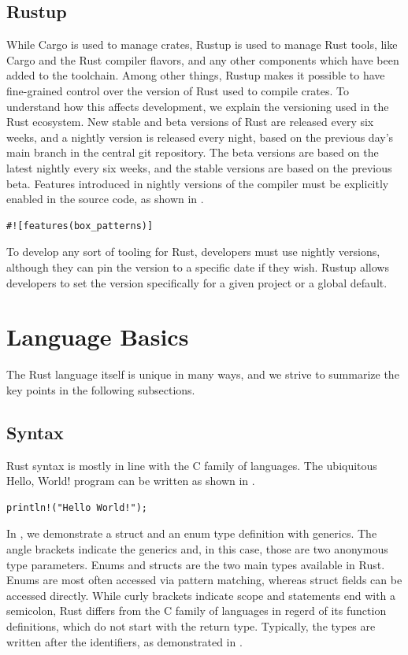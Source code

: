 \documentclass[paper=a4,%
  twoside,%
  BCOR4mm,%
  abstract=true,%
  toc=bibliography,%
  chapterprefix=true,%
  toc=bibliographynumbered,%
  open=right,%
  english,%
  pagesize=pdftex]{scrreprt}
\begin{document}
\subsection{Rustup}
While Cargo is used to manage crates, Rustup is used to manage Rust tools, like Cargo and the Rust compiler flavors, and any other components which have been added to the toolchain. Among other things, Rustup makes it possible to have fine-grained control over the version of Rust used to compile crates. To understand how this affects development, we explain the versioning used in the Rust ecosystem. New stable and beta versions of Rust are released every six weeks, and a nightly version is released every night, based on the previous day's main branch in the central git repository. The beta versions are based on the latest nightly every six weeks, and the stable versions are based on the previous beta.
Features introduced in nightly versions of the compiler must be explicitly enabled in the source code, as shown in .

\begin{lstlisting}[style=boxed, caption=Enabling features in Rust, label=lst:example-enable-feature]
#![features(box_patterns)]
\end{lstlisting}

To develop any sort of tooling for Rust, developers must use nightly versions, although they can pin the version to a specific date if they wish.
Rustup allows developers to set the version specifically for a given project or a global default.

\section{Language Basics}
The Rust language itself is unique in many ways, and we strive to summarize the key points in the following subsections.

\subsection{Syntax}
Rust syntax is mostly in line with the C family of languages. The ubiquitous Hello, World! program can be written as shown in .
\begin{lstlisting}[style=boxed, caption=Hello World, label=lst:example-hello-world]
println!("Hello World!");
\end{lstlisting}

In , we demonstrate a struct and an enum type definition with generics. The angle brackets indicate the generics and, in this case, those are two anonymous type parameters. Enums and structs are the two main types available in Rust. Enums are most often accessed via pattern matching, whereas struct fields can be accessed directly. While curly brackets indicate scope and statements end with a semicolon, Rust differs from the C family of languages in regerd of its function definitions, which do not start with the return type. Typically, the types are written after the identifiers, as demonstrated in .
\end{document}
